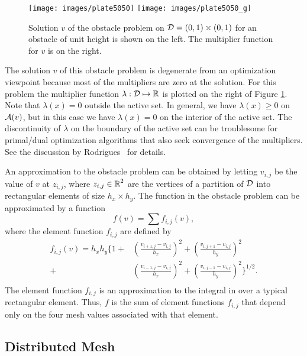 \begin{figure}
\centering
\texttt{[image: images/plate5050]}
\qquad
\texttt{[image: images/plate5050\_g]}
\caption{Solution $v$ of the obstacle problem  
on $ \mbox{$\cal D$} = (0,1) \times (0,1) $  for an obstacle of unit height is
shown on the left. The multiplier function for $v$ is on the right.
\label{fig:minsurf}
}
\end{figure}

The solution $v$ of this obstacle problem
is degenerate from an optimization
viewpoint because most of the multipliers are zero at
the solution. For this problem the multiplier function
$ \lambda : \mbox{$\cal D$} \mapsto \mbox{${\mathbb R}$} $ is plotted on the right of
Figure \ref{fig:minsurf}. Note that $ \lambda (x) = 0 $ 
outside the active set. In general, we have $ \lambda (x) \ge 0 $
on $ \mbox{$\cal A$} (v) $, but in this case we have $ \lambda(x) = 0 $
on the interior of the active set.
The discontinuity of $ \lambda $ on the boundary of the
active set can be troublesome for primal/dual optimization
algorithms that also seek convergence of the multipliers.
See the discussion by Rodrigues~\cite{REB01} for details.


An approximation to the obstacle problem can
be obtained by letting $ v_{i,j} $ be the value of $v$ at $
z_{i,j} $, where $ z_{i,j} \in \mbox{${\mathbb R}$}^2 $ are the vertices of a
partition of $ \mbox{$\cal D$} $ into rectangular elements
of size $ h_x \times h_y $. 
The function in the obstacle problem 
can be approximated by a function
\[
f(v) =  \sum f_{i,j} (v) ,
\]
where the element function $ f_{i,j}  $ are defined by
\[
\begin{split}
f_{i,j}  (v) = 
h_x h_y
\Biggl \{ 1 + 
  & \left ( \frac{ v_{i+1,j} - v_{i,j} } { h _x } \right )^2 + 
    \left ( \frac{ v_{i,j+1} - v_{i,j} } { h _y } \right )^2 \\
+  & \left ( \frac{ v_{i-1,j} - v_{i,j} } { h _x } \right )^2 + 
    \left ( \frac{ v_{i,j-1} - v_{i,j} } { h _y } \right )^2
 \Biggr \} ^ {1/2} . \\
\end{split}
\]
The element function $ f_{i,j} $ is an approximation to the integral
in  over a typical rectangular element.
Thus, $ f$ is the sum of element functions $ f_{i,j} $ that
depend only on the four mesh values associated with that element.

\subsection{Distributed Mesh}

